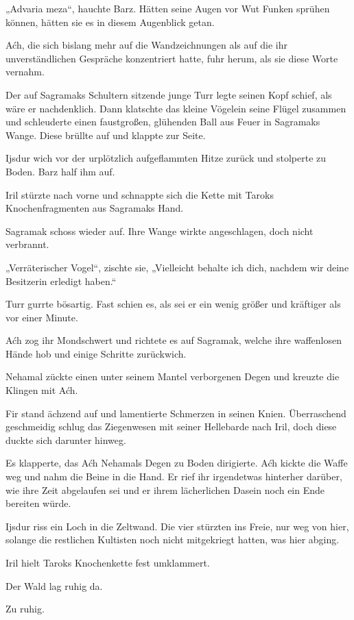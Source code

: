 „Advaria meza“, hauchte Barz. Hätten seine Augen vor Wut Funken sprühen können, hätten sie es in diesem Augenblick getan.

Aćh, die sich bislang mehr auf die Wandzeichnungen als auf die ihr unverständlichen Gespräche konzentriert hatte, fuhr herum, als sie diese Worte vernahm.

Der auf Sagramaks Schultern sitzende junge Turr legte seinen Kopf schief, als wäre er nachdenklich. Dann klatschte das kleine Vögelein seine Flügel zusammen und schleuderte einen faustgroßen, glühenden Ball aus Feuer in Sagramaks Wange. Diese brüllte auf und klappte zur Seite.

Ijsdur wich vor der urplötzlich aufgeflammten Hitze zurück und stolperte zu Boden. Barz half ihm auf.

Iril stürzte nach vorne und schnappte sich die Kette mit Taroks Knochenfragmenten aus Sagramaks Hand.

Sagramak schoss wieder auf. Ihre Wange wirkte angeschlagen, doch nicht verbrannt.

„Verräterischer Vogel“, zischte sie, „Vielleicht behalte ich dich, nachdem wir deine Besitzerin erledigt haben.“

Turr gurrte bösartig. Fast schien es, als sei er ein wenig größer und kräftiger als vor einer Minute.

Aćh zog ihr Mondschwert und richtete es auf Sagramak, welche ihre waffenlosen Hände hob und einige Schritte zurückwich.

Nehamal zückte einen unter seinem Mantel verborgenen Degen und kreuzte die Klingen mit Aćh.

Fir stand ächzend auf und lamentierte Schmerzen in seinen Knien. Überraschend geschmeidig schlug das Ziegenwesen mit seiner Hellebarde nach Iril, doch diese duckte sich darunter hinweg.

Es klapperte, das Aćh Nehamals Degen zu Boden dirigierte. Aćh kickte die Waffe weg und nahm die Beine in die Hand. Er rief ihr irgendetwas hinterher darüber, wie ihre Zeit abgelaufen sei und er ihrem lächerlichen Dasein noch ein Ende bereiten würde.

Ijsdur riss ein Loch in die Zeltwand. Die vier stürzten ins Freie, nur weg von hier, solange die restlichen Kultisten noch nicht mitgekriegt hatten, was hier abging.

Iril hielt Taroks Knochenkette fest umklammert.

Der Wald lag ruhig da.

Zu ruhig.

